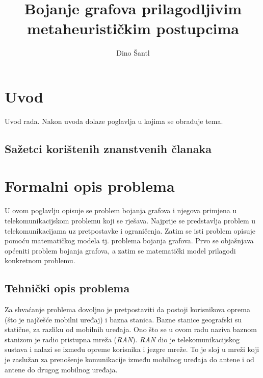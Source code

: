 \documentclass[times, utf8, diplomski, numeric]{fer}
\begin{document}

\title{Bojanje grafova prilagodljivim metaheurističkim postupcima}

\author{Dino Šantl}

\maketitle

\izvornik

\zahvala{}

\tableofcontents

\chapter{Uvod}
Uvod rada. Nakon uvoda dolaze poglavlja u kojima se obrađuje tema.

\section{Sažetci korištenih znanstvenih članaka}

\chapter{Formalni opis problema}

U ovom poglavlju opisuje se problem bojanja grafova i njegova primjena u telekomunikacijskom problemu koji se rješava. Najprije se predstavlja problem u telekomunikacijama uz pretpostavke i ograničenja. Zatim se isti problem opisuje pomoću matematičkog modela tj. problema bojanja grafova. Prvo se objašnjava općeniti problem bojanja grafova, a zatim se matematički model prilagodi konkretnom problemu.

\section{Tehnički opis problema}

Za shvaćanje problema dovoljno je pretpostaviti da postoji korisnikova oprema (što je najčešće mobilni uređaj) i bazna stanica. Bazne stanice geografski su statične, za razliku od mobilnih uređaja.
Ono što se u ovom radu naziva baznom stanizom je radio pristupna mreža  (\emph{RAN}). \emph{RAN} dio je telekomunikacijskog sustava i nalazi se između opreme korisnika i jezgre mreže. To je sloj u mreži koji je zaslužan za prenošenje komunikacije između mobilnog uređaja do antene i od antene do drugog mobilnog uređaja. 
\end{document}

